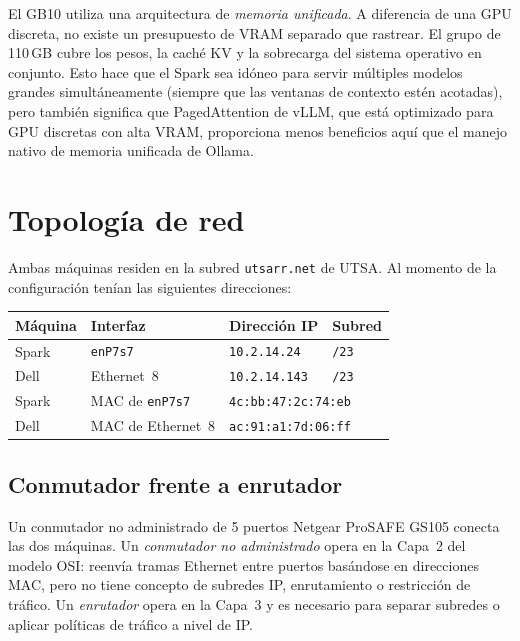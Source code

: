 \begin{warningbox}
El GB10 utiliza una arquitectura de \emph{memoria unificada}. A diferencia
de una GPU discreta, no existe un presupuesto de VRAM separado que
rastrear. El grupo de 110\,GB cubre los pesos, la caché KV y la sobrecarga
del sistema operativo en conjunto. Esto hace que el Spark sea idóneo para
servir múltiples modelos grandes simultáneamente (siempre que las ventanas
de contexto estén acotadas), pero también significa que PagedAttention de
vLLM, que está optimizado para GPU discretas con alta VRAM, proporciona
menos beneficios aquí que el manejo nativo de memoria unificada de Ollama.
\end{warningbox}

\section{Topología de red}
\label{sec:network}

Ambas máquinas residen en la subred \texttt{utsarr.net} de UTSA. Al momento
de la configuración tenían las siguientes direcciones:

\begin{center}
\begin{tabular}{llll}
\toprule
Máquina & Interfaz & Dirección IP & Subred \\
\midrule
Spark   & \texttt{enP7s7} & \texttt{10.2.14.24}  & \texttt{/23} \\
Dell    & Ethernet~8      & \texttt{10.2.14.143} & \texttt{/23} \\
\midrule
Spark   & MAC de \texttt{enP7s7} & \multicolumn{2}{l}{\texttt{4c:bb:47:2c:74:eb}} \\
Dell    & MAC de Ethernet~8      & \multicolumn{2}{l}{\texttt{ac:91:a1:7d:06:ff}} \\
\bottomrule
\end{tabular}
\end{center}

\subsection{Conmutador frente a enrutador}

Un conmutador no administrado de 5 puertos Netgear ProSAFE GS105 conecta
las dos máquinas. Un \emph{conmutador no administrado} opera en la Capa~2
del modelo OSI: reenvía tramas Ethernet entre puertos basándose en
direcciones MAC, pero no tiene concepto de subredes IP, enrutamiento o
restricción de tráfico. Un \emph{enrutador} opera en la Capa~3 y es
necesario para separar subredes o aplicar políticas de tráfico a nivel de IP.

